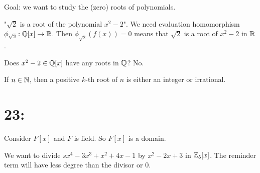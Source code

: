 \documentclass[class=article,crop=false]{standalone}
\begin{document}
Goal: we want to study the (zero) roots of polynomials.

"$ \sqrt{2} $ is a root of the polynomial $ x^2-2$". We need evaluation homomorphism $ \phi_{\sqrt{2} }: \mathbb{Q}[x] \to \mathbb{R}$. Then $ \phi_{\sqrt{2} }(f(x)) = 0$ means that $ \sqrt{2} $ is a root of $ x^2 -2$ in $ \mathbb{R}$.

Does $ x^2 - 2 \in \mathbb{Q}[x]$ have any roots in $ \mathbb{Q}$? No. 

\begin{thm}[]
If $ n \in \mathbb{N}$, then a positive $ k$-th root of  $ n$ is either an integer or irrational.
\end{thm}

\section*{23:}
Consider $ F[x]$ and  $ F$ is field. So  $ F[x]$ is a domain. 
\begin{eg}[]
	We want to divide $ sx^{4} - 3x^3 + x^2+ 4x-1$ by $ x^2-2x + 3$ in $ \mathbb{Z}_5[x]$. The reminder term will have less degree than the divisor or 0. 
\end{eg}
\end{document}
